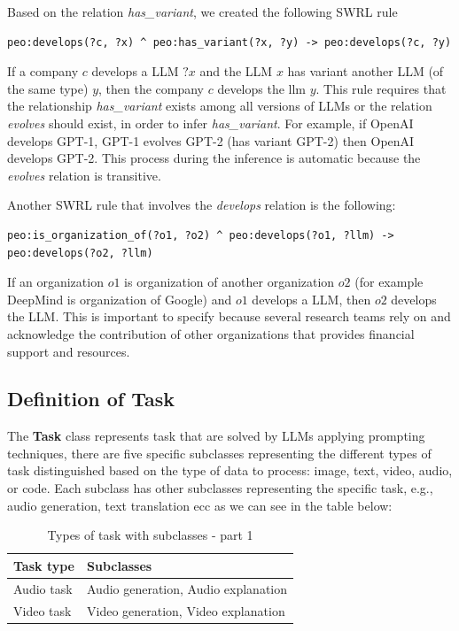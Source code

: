 Based on the relation \textit{has\_variant}, we created the following SWRL rule
\begin{lstlisting}
peo:develops(?c, ?x) ^ peo:has_variant(?x, ?y) -> peo:develops(?c, ?y)    
\end{lstlisting}
If a company $c$ develops a LLM $?x$ and the LLM $x$ has variant another LLM (of the same type) $y$, then the company $c$ develops the llm $y$.
This rule requires that the relationship \textit{has\_variant} exists among all versions of LLMs or the relation \textit{evolves} should exist, in order to infer \textit{has\_variant}.
For example, if OpenAI develops GPT-1, GPT-1 evolves GPT-2 (has variant GPT-2) then OpenAI develops GPT-2.
This process during the inference is automatic because the \textit{evolves} relation is transitive.

Another SWRL rule that involves the \textit{develops} relation is the following:
\begin{lstlisting}
peo:is_organization_of(?o1, ?o2) ^ peo:develops(?o1, ?llm) -> peo:develops(?o2, ?llm)
\end{lstlisting}
If an organization $o1$ is organization of another organization $o2$ (for example DeepMind is organization of Google) and $o1$ develops a LLM, then $o2$ develops the LLM.
This is important to specify because several research teams rely on and acknowledge the contribution of other organizations that provides financial support and resources.

\subsection{Definition of Task}
\label{subsection:4_3_4_task}
The \textbf{Task} class represents task that are solved by LLMs applying prompting techniques, there are five specific subclasses representing the different types of task distinguished based on the type of data to process: image, text, video, audio, or code.
Each subclass has other subclasses representing the specific task, e.g., audio generation, text translation ecc as we can see in the table below:
\begin{table}[H]
    \centering
    \begin{tabular}{|>{\raggedright\arraybackslash}p{6cm}|>{\raggedright\arraybackslash}p{6cm}|}
        \hline
        \textbf{Task type} & \textbf{Subclasses} \\ \hline
        Audio task & Audio generation, Audio explanation \\ \hline

        Video task & Video generation, Video explanation \\ \hline
    \end{tabular}
    \caption{Types of task with subclasses - part 1}
\end{table}

